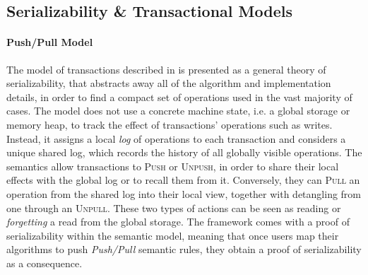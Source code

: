 \subsection{Serializability \& Transactional Models}

\label{sec:serTransMod}

\paragraph{Push/Pull Model}
The model of transactions described in \cite{pushPull} is presented as a general theory of serializability, that abstracts away all of the algorithm and implementation details, in order to find a compact set of operations used in the vast majority of cases. The model does not use a concrete machine state, i.e. a global storage or memory heap, to track the effect of transactions' operations such as writes. Instead, it assigns a local \textit{log} of operations to each transaction and considers a unique shared log, which records the history of all globally visible operations. The semantics allow transactions to \textsc{Push} or \textsc{Unpush}, in order to share their local effects with the global log or to recall them from it. Conversely, they can \textsc{Pull} an operation from the shared log into their local view, together with detangling from one through an \textsc{Unpull}. These two types of actions can be seen as reading or \textit{forgetting} a read from the global storage. The framework comes with a proof of serializability within the semantic model, meaning that once users map their algorithms to push \textit{Push/Pull} semantic rules, they obtain a proof of serializability as a consequence.